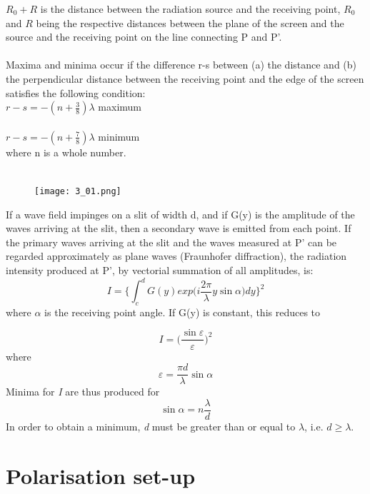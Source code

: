 \documentclass[12pt]{report}
\begin{document}
$R_0 + R$ is the distance between the radiation source and the receiving point, $R_0$ and $R$ being the respective distances between the plane of the screen and the source and the receiving point on the line connecting P and P’.\\ \\
Maxima and minima occur if the difference r-s between (a) the distance and (b) the perpendicular distance between the receiving point and the edge of the screen satisfies the following condition:\\
$ r-s = -(n+\frac{3}{8})\lambda$ \qquad maximum \\\\
$ r-s = -(n+\frac{7}{8})\lambda$ \qquad minimum\\
where n is a whole number.\\\\
\newpage
\begin{figure}
	\begin{center}
		\texttt{[image: 3\_01.png]}
	\end{center}
\end{figure}
If a wave field impinges on a slit of width d, and if G(y) is the amplitude of the waves arriving at the slit, then a secondary wave is emitted from each point.
If the primary waves arriving at the slit and the waves measured at P’ can be regarded approximately as plane waves (Fraunhofer diffraction), the radiation intensity produced at P’, by vectorial summation of all amplitudes, is:
\[I = \Big\{\int_{c}^{d}G(y)exp\big(i\frac{2\pi}{\lambda}y\sin{\alpha}\big)dy\Big\}^2\]
where $\alpha$ is the receiving point angle. If G(y) is constant, this reduces to

$$ I = \Big(\frac{\sin{\varepsilon}}{\varepsilon}\Big)^2 $$
where
$$ \varepsilon = \frac{\pi d}{\lambda}\sin{\alpha} $$
Minima for \textit{I} are thus produced for
$$ \sin{\alpha} = n\frac{\lambda}{d} $$
In order to obtain a minimum, \textit{d} must be greater than or equal to $\lambda$, i.e. $d\geq\lambda$.
\newpage


\section{Polarisation set-up} 
\end{document}
